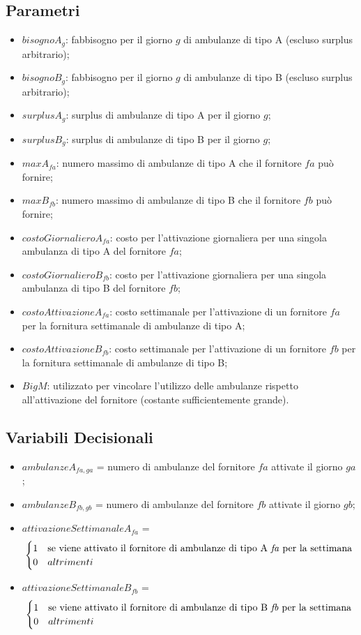 \documentclass[10pt, a4paper]{article}
\begin{document}
\subsection{Parametri}
\begin{itemize}
    \item $bisognoA_{g}$: fabbisogno per il giorno $g$ di ambulanze di tipo A (escluso surplus arbitrario);
    \item $bisognoB_{g}$: fabbisogno per il giorno $g$ di ambulanze di tipo B (escluso surplus arbitrario);
    \item $surplusA_{g}$: surplus di ambulanze di tipo A per il giorno $g$;
    \item $surplusB_{g}$: surplus di ambulanze di tipo B per il giorno $g$;
    \item $maxA_{fa}$: numero massimo di ambulanze di tipo A che il fornitore $fa$ può fornire;
    \item $maxB_{fb}$: numero massimo di ambulanze di tipo B che il fornitore $fb$ può fornire;
    \item $costoGiornalieroA_{fa}$: costo per l'attivazione giornaliera per una singola ambulanza di tipo A del fornitore $fa$;
    \item $costoGiornalieroB_{fb}$: costo per l'attivazione giornaliera per una singola ambulanza di tipo B del fornitore $fb$;
    \item $costoAttivazioneA_{fa}$: costo settimanale per l'attivazione di un fornitore $fa$ per la fornitura settimanale di ambulanze di tipo A;
    \item $costoAttivazioneB_{fb}$: costo settimanale per l'attivazione di un fornitore $fb$ per la fornitura settimanale di ambulanze di tipo B;
    \item $BigM$: utilizzato per vincolare l'utilizzo delle ambulanze rispetto all'attivazione del fornitore (costante sufficientemente grande).
\end{itemize}
\subsection{Variabili Decisionali}
\begin{itemize}
    \item $ambulanzeA_{fa, ga}$ = numero di ambulanze del fornitore $fa$ attivate il giorno $ga$;
    \item $ambulanzeB_{fb, gb}$ =  numero di ambulanze del fornitore $fb$ attivate il giorno $gb$;
    \item $attivazioneSettimanaleA_{fa}$ = 
    $$
    \begin{cases}
        1 & \text{se viene attivato il fornitore di ambulanze di tipo A \textit{fa} per la settimana} \\
        0 & altrimenti
    \end{cases}$$
    \item $attivazioneSettimanaleB_{fb}$ = 
    $$
    \begin{cases}
        1 & \text{se viene attivato il fornitore di ambulanze di tipo B \textit{fb} per la settimana} \\
        0 & altrimenti
    \end{cases}$$
\end{itemize}
\end{document}

